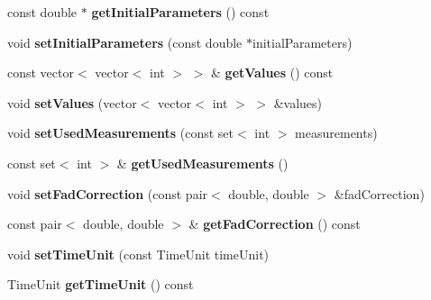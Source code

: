 \begin{DoxyCompactItemize}
\item 
\hypertarget{classDataHandle_a2273fbb63ac6b5b88f2fcd10b6578a24}{const double $\ast$ {\bfseries get\-Initial\-Parameters} () const }\label{classDataHandle_a2273fbb63ac6b5b88f2fcd10b6578a24}

\item 
\hypertarget{classDataHandle_a6ded2edbe17f9dc2ceeb6306c0ae4684}{void {\bfseries set\-Initial\-Parameters} (const double $\ast$initial\-Parameters)}\label{classDataHandle_a6ded2edbe17f9dc2ceeb6306c0ae4684}

\item 
\hypertarget{classDataHandle_a5f8951671ff5d22b39c0e85931552135}{const vector$<$ vector$<$ int $>$ $>$ \& {\bfseries get\-Values} () const }\label{classDataHandle_a5f8951671ff5d22b39c0e85931552135}

\item 
\hypertarget{classDataHandle_a6eda37bc92ad512e273d341aff1abbd7}{void {\bfseries set\-Values} (vector$<$ vector$<$ int $>$ $>$ \&values)}\label{classDataHandle_a6eda37bc92ad512e273d341aff1abbd7}

\item 
\hypertarget{classDataHandle_a16aa7bd6d05c938a919e8c36a570890d}{void {\bfseries set\-Used\-Measurements} (const set$<$ int $>$ measurements)}\label{classDataHandle_a16aa7bd6d05c938a919e8c36a570890d}

\item 
\hypertarget{classDataHandle_a8dd3496a7e7c942f5833f074a4045d3b}{const set$<$ int $>$ \& {\bfseries get\-Used\-Measurements} ()}\label{classDataHandle_a8dd3496a7e7c942f5833f074a4045d3b}

\item 
\hypertarget{classDataHandle_a34932be9a3d0e4dd5eaf1ebc6644c65d}{void {\bfseries set\-Fad\-Correction} (const pair$<$ double, double $>$ \&fad\-Correction)}\label{classDataHandle_a34932be9a3d0e4dd5eaf1ebc6644c65d}

\item 
\hypertarget{classDataHandle_ae42ee5520c137810b47aae715a61b5e4}{const pair$<$ double, double $>$ \& {\bfseries get\-Fad\-Correction} () const }\label{classDataHandle_ae42ee5520c137810b47aae715a61b5e4}

\item 
\hypertarget{classDataHandle_a9ce1a40b516cbdce59cafee6d51e9cde}{void {\bfseries set\-Time\-Unit} (const Time\-Unit time\-Unit)}\label{classDataHandle_a9ce1a40b516cbdce59cafee6d51e9cde}

\item 
\hypertarget{classDataHandle_a0337fa2debd248143d1768223e39c34d}{Time\-Unit {\bfseries get\-Time\-Unit} () const }\label{classDataHandle_a0337fa2debd248143d1768223e39c34d}


\end{DoxyCompactItemize}
